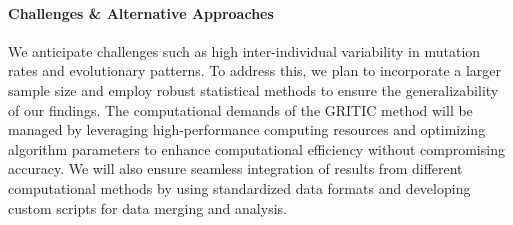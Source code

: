 \paragraph{Challenges \& Alternative Approaches}

We anticipate challenges such as high inter-individual variability in mutation rates and evolutionary patterns. 
To address this, we plan to incorporate a larger sample size and employ robust statistical methods to ensure the generalizability of our findings. 
The computational demands of the GRITIC method will be managed by leveraging high-performance computing resources 
and optimizing algorithm parameters to enhance computational efficiency without compromising accuracy. 
We will also ensure seamless integration of results from different computational methods by 
using standardized data formats and developing custom scripts for data merging and analysis.
